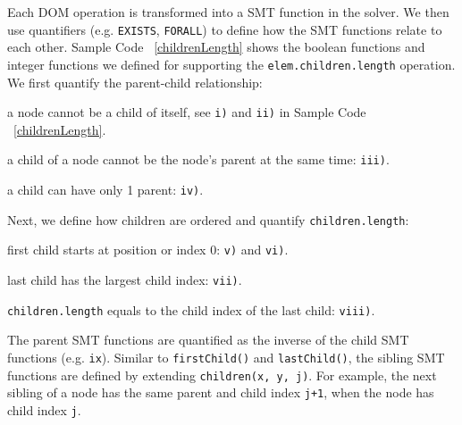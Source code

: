 	
Each DOM operation is transformed into a SMT function in the solver.  We then use quantifiers (e.g. {\tt EXISTS}, {\tt FORALL}) to define how the SMT functions relate to each other.  
Sample Code ~\ref{childrenLength} shows the boolean functions and integer functions we defined for supporting the {\tt elem.children.length} operation.  We first quantify the parent-child relationship: 
\begin{compactitem} 
\item a node cannot be a child of itself, see {\tt i)} and {\tt ii)} in Sample Code ~\ref{childrenLength}.
\item a child of a node cannot be the node's parent at the same time: {\tt iii)}.
\item a child can have only 1 parent: {\tt iv)}.
\end{compactitem}
Next, we define how children are ordered and quantify {\tt children.length}:
\begin{compactitem} 
\item first child starts at position or index 0: {\tt v)} and {\tt vi)}.
\item last child has the largest child index: {\tt vii)}.
\item {\tt children.length} equals to the child index of the last child: {\tt viii)}.
\end{compactitem}
The parent SMT functions are quantified as the inverse of the child SMT functions (e.g. {\tt ix}).  Similar to {\tt firstChild()} and {\tt lastChild()}, the sibling SMT functions are defined by extending {\tt children(x, y, j)}.  
For example, the next sibling of a node has the same parent and child index {\tt j+1}, when the node has child index {\tt j}.

